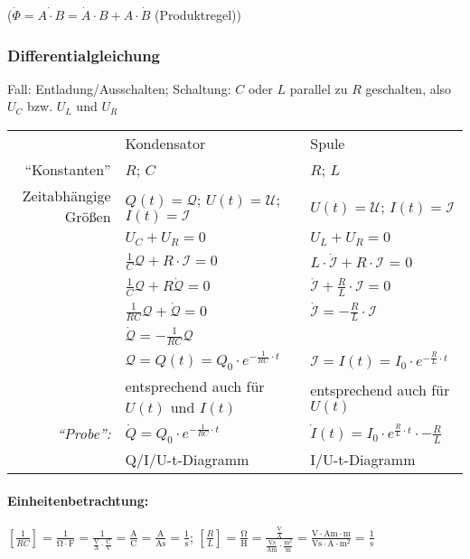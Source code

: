 \documentclass[a4paper]{scrartcl}
\begin{document}
($\dot{\Phi}=\dot{A \cdot B} = \dot{A} \cdot B + A \cdot \dot{B}$
(Produktregel))

\subsubsection{Differentialgleichung}
Fall: Entladung/Ausschalten; Schaltung: $C$ oder $L$ parallel zu $R$
geschalten, also $U_C$ bzw. $U_L$ und $U_R$
\\ \begin{tabular}{rl|l}
& Kondensator						& Spule \\
"`Konstanten"'&$R$; $C$				& $R$; $L$ \\
Zeitabhängige Größen & $Q(t)=\mathcal{Q}$; $U(t)=\mathcal{U}$;
	$I(t)=\mathcal{I}$ 				& $U(t)=\mathcal{U}$; $I(t)=\mathcal{I}$ \\
& $U_C + U_R = 0$ & $U_L + U_R = 0$ \\
& $\frac{1}{C} \mathcal{Q} + R \cdot \mathcal{I} = 0$ &
	$L \cdot \dot{\mathcal{I}} + R \cdot \mathcal{I}$ = 0 \\
& $\frac{1}{C} \mathcal{Q} + R \dot{\mathcal{Q}} = 0$ &
	$\dot{\mathcal{I}} + \frac{R}{L} \cdot \mathcal{I} = 0$ \\
& $\frac{1}{RC} \mathcal{Q} + \dot{\mathcal{Q}} = 0$ &
	$\dot{\mathcal{I}} = -\frac{R}{L} \cdot \mathcal{I}$ \\
& $\dot{\mathcal{Q}} = - \frac{1}{RC} \mathcal{Q}$ & \\
\hline %
& $\mathcal{Q} = Q(t) = Q_0 \cdot e^{-\frac{1}{RC} \cdot t}$ &
	$\mathcal{I} = I(t) = I_0 \cdot e^{-\frac{R}{L} \cdot t}$ \\
& entsprechend auch für $U(t)$ und $I(t)$ & entsprechend auch für $U(t)$ \\
\emph{"`Probe"':} & $\dot{Q} = Q_0 \cdot e^{-\frac{1}{RC} \cdot t}$ &
	$\dot{I}(t) = I_0 \cdot e^{\frac{R}{L} \cdot t} \cdot -\frac{R}{L}$ \\
& Q/I/U-t-Diagramm & I/U-t-Diagramm \\
\end{tabular}
\paragraph{Einheitenbetrachtung:} $[\frac{1}{RC}] = \mathrm{\frac{1}{\Omega
\cdot F} = \frac{1}{\frac{V}{A} \cdot
\frac{C}{V}} = \frac{A}{C} = \frac{A}{As} = \frac{1}{s}}$;
$[\frac{R}{L}] = \mathrm{\frac{\Omega}{H} = \frac{\frac{V}{A}}{\frac{Vs}{Am}
\cdot \frac{m^2}{m}} = \frac{V \cdot Am \cdot m}{Vs \cdot A \cdot m^2} =
\frac{1}{s}}$
\end{document}
